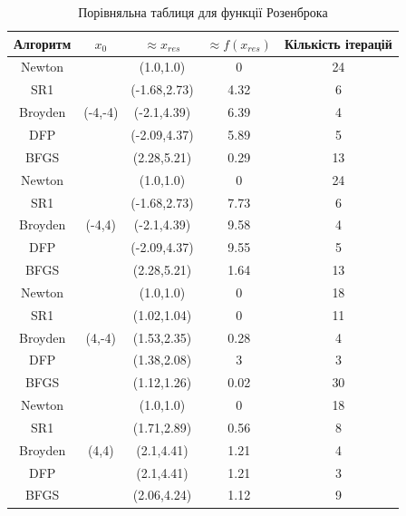 \begin{table}[h!]
    \centering
    \begin{tabular}{|c|c|c|c|c|}
        \hline
        \textbf{Алгоритм} & $x_{0}$ & $\approx x_{res}$ & $\approx f(x_{res})$ & \textbf{Кількість ітерацій}  \\
        \hline
        Newton & \multirow{5}{*}{(-4,-4)} & (1.0,1.0) & 0 & 24 \\
        \cline{1-1} \cline{3-5}
        SR1 & & (-1.68,2.73) & 4.32 & 6 \\
        \cline{1-1} \cline{3-5}
        Broyden & & (-2.1,4.39) & 6.39 & 4 \\
        \cline{1-1} \cline{3-5}
        DFP & & (-2.09,4.37) & 5.89 & 5 \\
        \cline{1-1} \cline{3-5}
        BFGS & & (2.28,5.21) & 0.29 & 13 \\
        \hline
        Newton & \multirow{5}{*}{(-4,4)} & (1.0,1.0) & 0 & 24 \\
        \cline{1-1} \cline{3-5}
        SR1 & & (-1.68,2.73) & 7.73 & 6 \\
        \cline{1-1} \cline{3-5}
        Broyden & & (-2.1,4.39) & 9.58 & 4 \\
        \cline{1-1} \cline{3-5}
        DFP & & (-2.09,4.37) & 9.55 & 5 \\
        \cline{1-1} \cline{3-5}
        BFGS & & (2.28,5.21) & 1.64 & 13 \\
        \hline
        Newton & \multirow{5}{*}{(4,-4)} & (1.0,1.0) & 0 & 18 \\
        \cline{1-1} \cline{3-5}
        SR1 & & (1.02,1.04) & 0 & 11 \\
        \cline{1-1} \cline{3-5}
        Broyden & & (1.53,2.35) & 0.28 & 4 \\
        \cline{1-1} \cline{3-5}
        DFP & & (1.38,2.08) & 3 & 3 \\
        \cline{1-1} \cline{3-5}
        BFGS & & (1.12,1.26) & 0.02 & 30 \\
        \hline
        Newton & \multirow{5}{*}{(4,4)} & (1.0,1.0) & 0 & 18 \\
        \cline{1-1} \cline{3-5}
        SR1 & & (1.71,2.89) & 0.56 & 8 \\
        \cline{1-1} \cline{3-5}
        Broyden & & (2.1,4.41) & 1.21 & 4 \\
        \cline{1-1} \cline{3-5}
        DFP & & (2.1,4.41) & 1.21 & 3 \\
        \cline{1-1} \cline{3-5}
        BFGS & & (2.06,4.24) & 1.12 & 9 \\
        \hline
    \end{tabular}
    \caption{Порівняльна таблиця для функції Розенброка}
\end{table}

